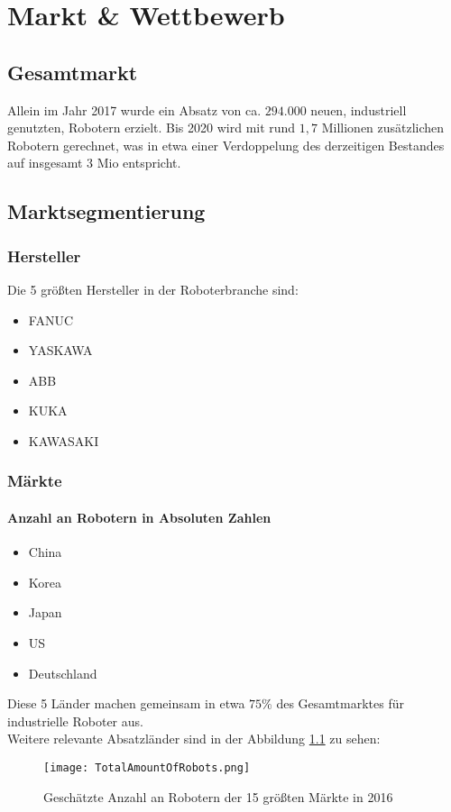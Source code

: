 \chapter{Markt \& Wettbewerb}
\label{sec:Marketing}

\section{Gesamtmarkt}
Allein im Jahr 2017 wurde ein Absatz von ca. $294.000$ neuen, industriell genutzten, Robotern erzielt. Bis 2020 wird mit rund $1,7$ Millionen zusätzlichen Robotern gerechnet, was in etwa einer Verdoppelung des derzeitigen Bestandes auf insgesamt $3$ Mio entspricht.

\section{Marktsegmentierung}
\subsection{Hersteller}
Die 5 größten Hersteller in der Roboterbranche sind:
\begin{itemize}
\item FANUC
\item YASKAWA
\item ABB
\item KUKA
\item KAWASAKI
\end{itemize}

\subsection{Märkte}
\subsubsection{Anzahl an Robotern in Absoluten Zahlen}
\begin{itemize}
\item China
\item Korea
\item Japan
\item US
\item Deutschland
\end{itemize}
Diese 5 Länder machen gemeinsam in etwa $75$\% des Gesamtmarktes für industrielle Roboter aus.\\
Weitere relevante Absatzländer sind in der Abbildung \ref{fig:TotalAmountOfRobots} zu sehen:
\begin{figure}[h]
	\centering
	\texttt{[image: TotalAmountOfRobots.png]}
	\caption{Geschätzte Anzahl an Robotern der 15 größten Märkte in 2016}
	\label{fig:TotalAmountOfRobots}
\end{figure}
